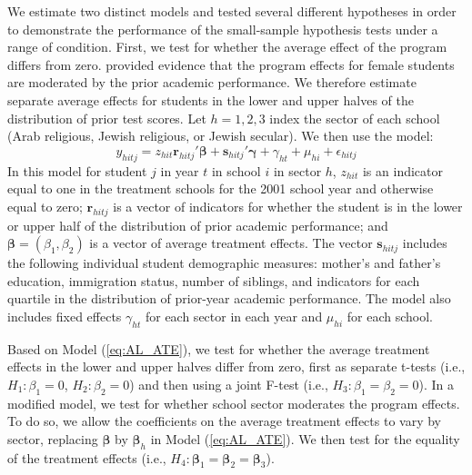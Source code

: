 \documentclass[12pt]{article}\usepackage[]{graphicx}\usepackage[]{color}
\newcommand{\bm}{\mathbf}
\newcommand{\bs}{\boldsymbol}
\begin{document}
We estimate two distinct models and tested several different hypotheses in order to demonstrate the performance of the small-sample hypothesis tests under a range of condition. 
First, we test for whether the average effect of the program differs from zero. \citet{Angrist2009effects} provided evidence that the program effects for female students are moderated by the prior academic performance. 
We therefore estimate separate average effects for students in the lower and upper halves of the distribution of prior test scores. 
Let $h = 1,2,3$ index the sector of each school (Arab religious, Jewish religious, or Jewish secular). 
We then use the model: 
\begin{equation}
\label{eq:AL_ATE}
y_{hitj} = z_{hit}\bm{r}_{hitj}'\bs\beta + \bm{s}_{hitj}'\bs\gamma + \gamma_{ht} + \mu_{hi} + \epsilon_{hitj}
\end{equation}
In this model for student $j$ in year $t$ in school $i$ in sector $h$, $z_{hit}$ is an indicator equal to one in the treatment schools for the 2001 school year and otherwise equal to zero; $\bm{r}_{hitj}$ is a vector of indicators for whether the student is in the lower or upper half of the distribution of prior academic performance; and $\bs\beta = \left(\beta_1, \beta_2\right)$ is a vector of average treatment effects. 
The vector $\bm{s}_{hitj}$ includes the following individual student demographic measures: mother's and father's education, immigration status, number of siblings, and indicators for each quartile in the distribution of prior-year academic performance. 
The model also includes fixed effects $\gamma_{ht}$ for each sector in each year and $\mu_{hi}$ for each school. 

Based on Model (\ref{eq:AL_ATE}), we test for whether the average treatment effects in the lower and upper halves differ from zero, first as separate t-tests (i.e., $H_1: \beta_1 = 0$, $H_2: \beta_2 = 0$) and then using a joint F-test (i.e., $H_3: \beta_1 = \beta_2 = 0$). 
In a modified model, we test for whether school sector moderates the program effects. 
To do so, we allow the coefficients on the average treatment effects to vary by sector, replacing $\bs\beta$ by $\bs\beta_h$ in Model (\ref{eq:AL_ATE}). We then test for the equality of the treatment effects (i.e., $H_4: \bs\beta_1 = \bs\beta_2 = \bs\beta_3$). 
\end{document}
